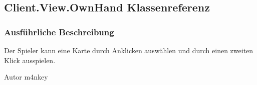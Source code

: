 \hypertarget{a00071}{\subsection{Client.\-View.\-Own\-Hand Klassenreferenz}
\label{a00071}
}


\subsubsection{Ausführliche Beschreibung}
Der Spieler kann eine Karte durch Anklicken auswählen und durch einen zweiten Klick ausspielen.

\begin{DoxyAuthor}{Autor}
m4nkey 
\end{DoxyAuthor}

